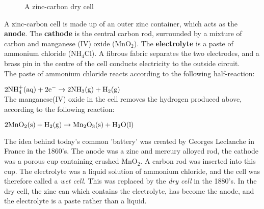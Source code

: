 \begin{center}
\begin{figure}[h]
\caption{A zinc-carbon dry cell}
\label{fig:chemindustry:zinc-carbon}
\end{figure}
\end{center}


A zinc-carbon cell is made up of an outer zinc container, which acts as the \textbf{anode}. The \textbf{cathode} is the central carbon rod, surrounded by a mixture of carbon and manganese (IV) oxide (MnO$_{2}$). The \textbf{electrolyte} is a paste of ammonium chloride (NH$_{4}$Cl). A fibrous fabric separates the two electrodes, and a brass pin in the centre of the cell conducts electricity to the outside circuit. \\

The paste of ammonium chloride reacts according to the following half-reaction:

$\rm{2NH_{4}^{+}(aq) + 2e^{-} \rightarrow 2NH_{3}(g) + H_{2}(g)}$\\

The manganese(IV) oxide in the cell removes the hydrogen produced above, according to the following reaction:

$\rm{2MnO_{2}(s) + H_{2}(g) \rightarrow Mn_{2}O_{3}(s) + H_{2}O(l)}$\\
\begin{IFact}{
The idea behind today's common 'battery' was created by Georges Leclanche in France in the 1860's. The anode was a zinc and mercury alloyed rod, the cathode was a porous cup containing crushed MnO$_{2}$. A carbon rod was inserted into this cup. The electrolyte was a liquid solution of ammonium chloride, and the cell was therefore called a \textit{wet cell}. This was replaced by the \textit{dry cell} in the 1880's. In the dry cell, the zinc can which contains the electrolyte, has become the anode, and the electrolyte is a paste rather than a liquid. 
}
\end{IFact} 

